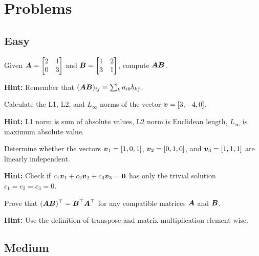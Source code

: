 
\section*{Problems}

\subsection*{Easy}

\begin{problem}
Given $\boldsymbol{A} = \begin{bmatrix} 2 & 1 \\ 0 & 3 \end{bmatrix}$ and $\boldsymbol{B} = \begin{bmatrix} 1 & 2 \\ 3 & 1 \end{bmatrix}$, compute $\boldsymbol{A}\boldsymbol{B}$.

\textbf{Hint:} Remember that $(\boldsymbol{A}\boldsymbol{B})_{ij} = \sum_k a_{ik}b_{kj}$.
\end{problem}

\begin{problem}
Calculate the L1, L2, and $L_\infty$ norms of the vector $\boldsymbol{v} = [3, -4, 0]$.

\textbf{Hint:} L1 norm is sum of absolute values, L2 norm is Euclidean length, $L_\infty$ is maximum absolute value.
\end{problem}

\begin{problem}
Determine whether the vectors $\boldsymbol{v}_1 = [1, 0, 1]$, $\boldsymbol{v}_2 = [0, 1, 0]$, and $\boldsymbol{v}_3 = [1, 1, 1]$ are linearly independent.

\textbf{Hint:} Check if $c_1\boldsymbol{v}_1 + c_2\boldsymbol{v}_2 + c_3\boldsymbol{v}_3 = \boldsymbol{0}$ has only the trivial solution $c_1 = c_2 = c_3 = 0$.
\end{problem}

\begin{problem}
Prove that $(\boldsymbol{A}\boldsymbol{B})^\top = \boldsymbol{B}^\top\boldsymbol{A}^\top$ for any compatible matrices $\boldsymbol{A}$ and $\boldsymbol{B}$.

\textbf{Hint:} Use the definition of transpose and matrix multiplication element-wise.
\end{problem}

\subsection*{Medium}

